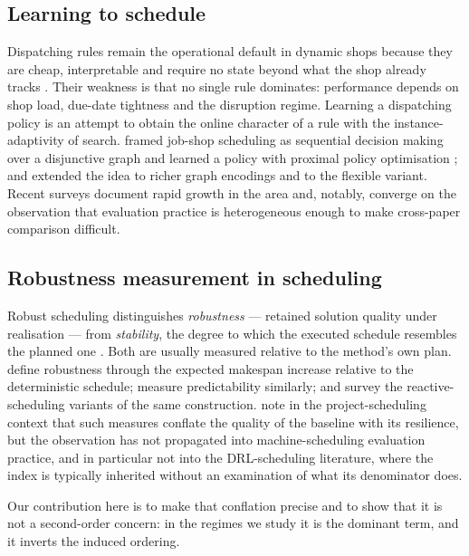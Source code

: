 \documentclass[a4paper,fleqn]{cas-sc}
\begin{document}
\subsection{Learning to schedule}

Dispatching rules remain the operational default in dynamic shops because they
are cheap, interpretable and require no state beyond what the shop already
tracks \citep{haupt1989,holthaus1997}. Their weakness is that no single rule
dominates: performance depends on shop load, due-date tightness and the
disruption regime. Learning a dispatching policy is an attempt to obtain the
online character of a rule with the instance-adaptivity of search.
\citet{zhang2020} framed job-shop scheduling as sequential decision making over
a disjunctive graph and learned a policy with proximal policy optimisation
\citep{schulman2017}; \citet{park2021} and \citet{song2023} extended the idea to
richer graph encodings and to the flexible variant. Recent surveys
\citep{kayhan2023,smit2025,huang2025,xu2024survey} document rapid growth in the
area and, notably, converge on the observation that evaluation practice is
heterogeneous enough to make cross-paper comparison difficult.

\subsection{Robustness measurement in scheduling}

Robust scheduling distinguishes \emph{robustness} --- retained solution quality
under realisation --- from \emph{stability}, the degree to which the executed
schedule resembles the planned one \citep{leon1994,goren2008}. Both are usually
measured relative to the method's own plan. \citet{leon1994} define robustness
through the expected makespan increase relative to the deterministic schedule;
\citet{mehta1998} measure predictability similarly; \citet{sabuncuoglu2000} and
\citet{aytug2005} survey the reactive-scheduling variants of the same
construction. \citet{herroelen2005} note in the project-scheduling context that
such measures conflate the quality of the baseline with its resilience, but the
observation has not propagated into machine-scheduling evaluation practice, and
in particular not into the DRL-scheduling literature, where the index is
typically inherited without an examination of what its denominator does.

Our contribution here is to make that conflation precise and to show that it is
not a second-order concern: in the regimes we study it is the dominant term, and
it inverts the induced ordering.
\end{document}
